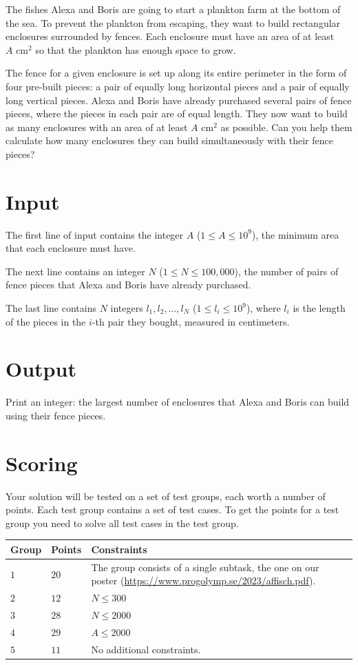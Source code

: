 The fishes Alexa and Boris are going to start a plankton farm at the bottom of the sea. To prevent
the plankton from escaping, they want to build rectangular enclosures surrounded by fences.
Each enclosure must have an area of at least $A \text{ cm}^2$ so that the plankton has enough space to grow.

The fence for a given enclosure is set up along its entire perimeter in the form of four pre-built pieces:
a pair of equally long horizontal pieces and a pair of equally long vertical pieces. Alexa and Boris have
already purchased several pairs of fence pieces, where the pieces in each pair are of equal length.
They now want to build as many enclosures with an area of at least $A \text{ cm}^2$ as possible. Can
you help them calculate how many enclosures they can build simultaneously with their fence pieces?


\section*{Input}
The first line of input contains the integer $A$ ($1 \leq A \leq 10^9$), the minimum area that each enclosure must have.

The next line contains an integer $N$ ($1 \leq N \leq 100,000$), the number of pairs of fence pieces that
Alexa and Boris have already purchased.

The last line contains $N$ integers $l_1, l_2, \dots, l_N$ ($1 \leq l_i \leq 10^9$), where $l_i$ is the length
of the pieces in the $i$-th pair they bought, measured in centimeters.

\section*{Output}
Print an integer: the largest number of enclosures that Alexa and Boris can build using their fence pieces.

\section*{Scoring}
Your solution will be tested on a set of test groups, each worth a number of points. Each test group contains
a set of test cases. To get the points for a test group you need to solve all test cases in the test group.

\noindent
\begin{tabular}{| l | l | p{12cm} |}
  \hline
  \textbf{Group} & \textbf{Points} & \textbf{Constraints} \\ \hline
  $1$    & $20$       & The group consists of a single subtask, the one on our poster (\url{https://www.progolymp.se/2023/affisch.pdf}). \\ \hline
  $2$    & $12$       & $N \le 300$ \\ \hline
  $3$    & $28$       & $N \le 2000$ \\ \hline
  $4$    & $29$       & $A \le 2000$ \\ \hline
  $5$    & $11$       & No additional constraints. \\ \hline
\end{tabular}

